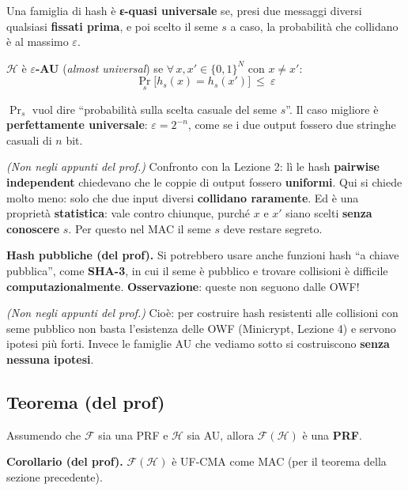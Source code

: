 \begin{inbreve}
Una famiglia di hash è \textbf{ε-quasi universale} se, presi due messaggi diversi qualsiasi \textbf{fissati prima}, e poi scelto il seme \(s\) a caso, la probabilità che collidano è al massimo \(\varepsilon\).
\end{inbreve}

\(\mathcal{H}\) è \textbf{\(\varepsilon\)-AU} (\emph{almost universal}) se \(\forall\, x, x' \in \{0,1\}^N\) con \(x \ne x'\):
\[
\Pr_s\big[h_s(x) = h_s(x')\big] \ \le\ \varepsilon
\]

\(\Pr_s\) vuol dire ``probabilità sulla scelta casuale del seme \(s\)''. Il caso migliore è \textbf{perfettamente universale}: \(\varepsilon = 2^{-n}\), come se i due output fossero due stringhe casuali di \(n\) bit.

\begin{nota}
\emph{(Non negli appunti del prof.)} Confronto con la Lezione 2: lì le hash \textbf{pairwise independent} chiedevano che le coppie di output fossero \textbf{uniformi}. Qui si chiede molto meno: solo che due input diversi \textbf{collidano raramente}. Ed è una proprietà \textbf{statistica}: vale contro chiunque, purché \(x\) e \(x'\) siano scelti \textbf{senza conoscere} \(s\). Per questo nel MAC il seme \(s\) deve restare segreto.
\end{nota}

\textbf{Hash pubbliche (del prof).} Si potrebbero usare anche funzioni hash ``a chiave pubblica'', come \textbf{SHA-3}, in cui il seme è pubblico e trovare collisioni è difficile \textbf{computazionalmente}. \textbf{Osservazione}: queste non seguono dalle OWF!

\emph{(Non negli appunti del prof.)} Cioè: per costruire hash resistenti alle collisioni con seme pubblico non basta l'esistenza delle OWF (Minicrypt, Lezione 4) e servono ipotesi più forti. Invece le famiglie AU che vediamo sotto si costruiscono \textbf{senza nessuna ipotesi}.

\subsection{Teorema (del prof)}

Assumendo che \(\mathcal{F}\) sia una PRF e \(\mathcal{H}\) sia AU, allora \(\mathcal{F}(\mathcal{H})\) è una \textbf{PRF}.

\textbf{Corollario (del prof).} \(\mathcal{F}(\mathcal{H})\) è UF-CMA come MAC (per il teorema della sezione precedente).

